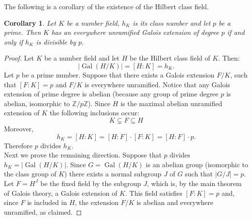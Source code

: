 \documentclass[12pt]{article}
\newtheorem{cor}{Corollary}
\newcommand{\Ints}{\mathbb{Z}}
\begin{document}
The following is a corollary of the existence of the Hilbert class field.

\begin{cor}
Let $K$ be a number field, $h_K$ is its class number and let $p$ be a prime. Then $K$ has an everywhere unramified Galois extension of degree $p$ if and only if $h_K$ is divisible by $p$.
\end{cor}

\begin{proof}
Let $K$ be a number field and let $H$ be the Hilbert class field of $K$. Then:
$$|\operatorname{Gal}(H/K)|=[H:K]=h_K.$$
Let $p$ be a prime number. Suppose that there exists a Galois extension $F/K$, such that $[F:K]=p$ and $F/K$ is everywhere unramified. Notice that any Galois extension of prime degree is abelian (because any group of prime degree $p$ is abelian, isomorphic to $\Ints/p\Ints$). Since $H$ is the maximal abelian unramified extension of $K$ the following inclusions occur:
$$K \subsetneq F\subseteq H$$
Moreover, 
$$h_K=[H:K]=[H:F]\cdot[F:K]=[H:F]\cdot p.$$
Therefore $p$ divides $h_K$.\\

Next we prove the remaining direction. Suppose that $p$ divides $h_K=|\operatorname{Gal}(H/K)|$. Since $G=\operatorname{Gal}(H/K)$ is an abelian group (isomorphic to the class group of $K$) there exists a normal subgroup $J$ of $G$ such that $|G/J|=p$. Let $F=H^J$ be the fixed field by the subgroup $J$, which is, by the main theorem of Galois theory, a Galois extension of $K$. This field satisfies $[F:K]=p$ and, since $F$ is included in $H$, the extension $F/K$ is abelian and everywhere unramified, as claimed.    
\end{proof}
\end{document}
